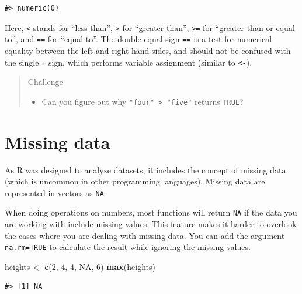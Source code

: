 \documentclass[]{book}
\newenvironment{Shaded}{\begin{snugshade}}{\end{snugshade}}
\newcommand{\KeywordTok}[1]{\textcolor[rgb]{0.13,0.29,0.53}{\textbf{#1}}}
\newcommand{\DecValTok}[1]{\textcolor[rgb]{0.00,0.00,0.81}{#1}}
\newcommand{\StringTok}[1]{\textcolor[rgb]{0.31,0.60,0.02}{#1}}
\newcommand{\OtherTok}[1]{\textcolor[rgb]{0.56,0.35,0.01}{#1}}
\newcommand{\NormalTok}[1]{#1}
\providecommand{\tightlist}{%
  \setlength{\itemsep}{0pt}\setlength{\parskip}{0pt}}
\theoremstyle{definition}
\theoremstyle{definition}
\theoremstyle{remark}
\begin{document}
\begin{verbatim}
#> numeric(0)
\end{verbatim}

Here, \texttt{\textless{}} stands for ``less than'',
\texttt{\textgreater{}} for ``greater than'', \texttt{\textgreater{}=}
for ``greater than or equal to'', and \texttt{==} for ``equal to''. The
double equal sign \texttt{==} is a test for numerical equality between
the left and right hand sides, and should not be confused with the
single \texttt{=} sign, which performs variable assignment (similar to
\texttt{\textless{}-}).

\begin{quote}
Challenge

\begin{itemize}
\tightlist
\item
  Can you figure out why \texttt{"four"\ \textgreater{}\ "five"} returns
  \texttt{TRUE}?
\end{itemize}
\end{quote}

\section{Missing data}\label{missing-data}

As R was designed to analyze datasets, it includes the concept of
missing data (which is uncommon in other programming languages). Missing
data are represented in vectors as \texttt{NA}.

When doing operations on numbers, most functions will return \texttt{NA}
if the data you are working with include missing values. This feature
makes it harder to overlook the cases where you are dealing with missing
data. You can add the argument \texttt{na.rm=TRUE} to calculate the
result while ignoring the missing values.

\begin{Shaded}
\begin{Highlighting}[]
\NormalTok{heights <-}\StringTok{ }\KeywordTok{c}\NormalTok{(}\DecValTok{2}\NormalTok{, }\DecValTok{4}\NormalTok{, }\DecValTok{4}\NormalTok{, }\OtherTok{NA}\NormalTok{, }\DecValTok{6}\NormalTok{)}
\KeywordTok{max}\NormalTok{(heights)}
\end{Highlighting}
\end{Shaded}

\begin{verbatim}
#> [1] NA
\end{verbatim}
\end{document}

